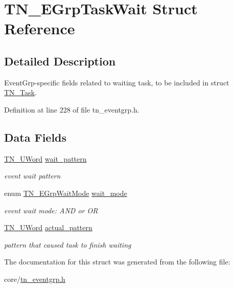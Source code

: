 \hypertarget{structTN__EGrpTaskWait}{\section{T\+N\+\_\+\+E\+Grp\+Task\+Wait Struct Reference}
\label{structTN__EGrpTaskWait}
}


\subsection{Detailed Description}
Event\+Grp-\/specific fields related to waiting task, to be included in struct \hyperlink{structTN__Task}{T\+N\+\_\+\+Task}. 

Definition at line 228 of file tn\+\_\+eventgrp.\+h.

\subsection*{Data Fields}
\begin{DoxyCompactItemize}
\item 
\hypertarget{structTN__EGrpTaskWait_a9e35b117bbf6c8ed435bf08b7ca875b3}{\hyperlink{tn__arch__example_8h_ab80cba0fe9ffcd9011d53dfeb9e39bf4}{T\+N\+\_\+\+U\+Word} \hyperlink{structTN__EGrpTaskWait_a9e35b117bbf6c8ed435bf08b7ca875b3}{wait\+\_\+pattern}}\label{structTN__EGrpTaskWait_a9e35b117bbf6c8ed435bf08b7ca875b3}

\begin{DoxyCompactList}\small\item\em event wait pattern \end{DoxyCompactList}\item 
\hypertarget{structTN__EGrpTaskWait_a0f62cf02ae71ab6a79b01f28f48854f8}{enum \hyperlink{tn__eventgrp_8h_a9d42ee61ae8da342f1cd6440b7e54bbd}{T\+N\+\_\+\+E\+Grp\+Wait\+Mode} \hyperlink{structTN__EGrpTaskWait_a0f62cf02ae71ab6a79b01f28f48854f8}{wait\+\_\+mode}}\label{structTN__EGrpTaskWait_a0f62cf02ae71ab6a79b01f28f48854f8}

\begin{DoxyCompactList}\small\item\em event wait mode\+: {\ttfamily A\+N\+D} or {\ttfamily O\+R} \end{DoxyCompactList}\item 
\hypertarget{structTN__EGrpTaskWait_ab0dd157cd06693b45a73a4b82ad713e8}{\hyperlink{tn__arch__example_8h_ab80cba0fe9ffcd9011d53dfeb9e39bf4}{T\+N\+\_\+\+U\+Word} \hyperlink{structTN__EGrpTaskWait_ab0dd157cd06693b45a73a4b82ad713e8}{actual\+\_\+pattern}}\label{structTN__EGrpTaskWait_ab0dd157cd06693b45a73a4b82ad713e8}

\begin{DoxyCompactList}\small\item\em pattern that caused task to finish waiting \end{DoxyCompactList}\end{DoxyCompactItemize}


The documentation for this struct was generated from the following file\+:\begin{DoxyCompactItemize}
\item 
core/\hyperlink{tn__eventgrp_8h}{tn\+\_\+eventgrp.\+h}\end{DoxyCompactItemize}
